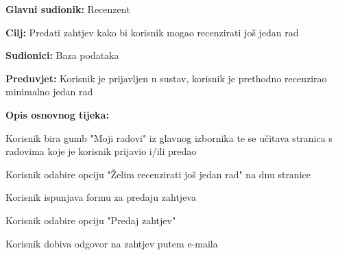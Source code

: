 					\noindent {}
					\begin{packed_item}
	
						\item \textbf{Glavni sudionik: } Recenzent
						\item  \textbf{Cilj:} Predati zahtjev kako bi korisnik mogao recenzirati još jedan rad
						\item  \textbf{Sudionici:} Baza podataka
						\item  \textbf{Preduvjet:} Korisnik je prijavljen u sustav, korisnik je prethodno recenzirao minimalno jedan rad
						\item  \textbf{Opis osnovnog tijeka:}
						
						\item[] \begin{packed_enum}
							\item Korisnik bira gumb "Moji radovi" iz glavnog izbornika te se učitava stranica s radovima koje je korisnik prijavio i/ili predao
							\item Korisnik odabire opciju "Želim recenzirati još jedan rad" na dnu stranice
							\item Korisnik ispunjava formu za predaju zahtjeva
							\item Korisnik odabire opciju "Predaj zahtjev"
							\item Korisnik dobiva odgovor na zahtjev putem e-maila

					
						\end{packed_enum}
					\end{packed_item}

